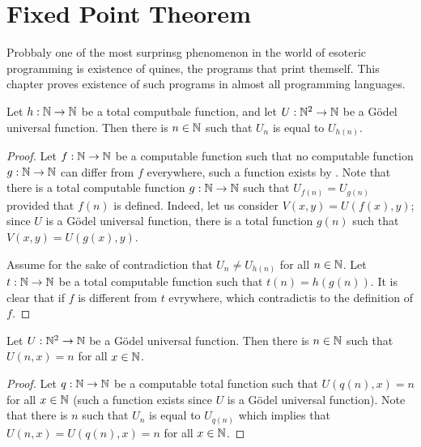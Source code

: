 \chapter{Fixed Point Theorem}
Probbaly one of the most surprinsg phenomenon in the world of esoteric 
programming is existence of quines, the programs that print themself.
This chapter proves existence of such programs in almost all programming
languages.

\begin{theorem}
\label{theorem:kleene}
  Let $h : {\mathbb{N}} \to {\mathbb{N}}$ be a total computbale function, and let $U : {\mathbb{N}}^2 \to {\mathbb{N}}$
  be a G\"odel universal function. Then there is $n \in {\mathbb{N}}$ such that $U_n$ is
  equal to $U_{h(n)}$.
\end{theorem}
\begin{proof}
  Let $f : {\mathbb{N}} \to {\mathbb{N}}$ be a computable function such that no computable function
  $g : {\mathbb{N}} \to {\mathbb{N}}$ can differ from $f$ everywhere, such a function exists by
  . Note that there is a total computable
  function $g : {\mathbb{N}} \to {\mathbb{N}}$ such that $U_{f(n)} = U_{g(n)}$ provided that $f(n)$
  is defined. Indeed, let us consider $V(x, y) = U(f(x), y)$; since $U$ is a
  G\"odel universal function, there is a total function $g(n)$ such that
  $V(x, y) = U(g(x), y)$.

  Assume for the sake of contradiction that $U_n \neq U_{h(n)}$ for all $n \in
  {\mathbb{N}}$. Let $t : {\mathbb{N}} \to {\mathbb{N}}$ be a total computable function such that $t(n) =
  h(g(n))$. It is clear that if $f$ is different from $t$ evrywhere, which
  contradictis to the definition of $f$.
\end{proof}

\begin{corollary}
  Let $U : {\mathbb{N}}^2 \to {\mathbb{N}}$ be a G\"odel universal function. Then there is $n \in
  {\mathbb{N}}$ such that $U(n, x) = n$ for all $x \in {\mathbb{N}}$.
\end{corollary}
\begin{proof}
  Let $q : {\mathbb{N}} \to {\mathbb{N}}$ be a computable total function such that $U(q(n), x) = n$
  for all $x \in {\mathbb{N}}$ (such a function exists since $U$ is a G\"odel universal
  function). Note that there is $n$ such that $U_n$ is equal to $U_{q(n)}$ which
  implies that $U(n, x) = U(q(n), x) = n$ for all $x \in {\mathbb{N}}$.
\end{proof}

